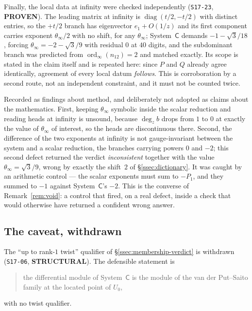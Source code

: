 Finally, the local data at infinity were checked independently
(\texttt{S17-23}, \textbf{PROVEN}). The leading matrix at infinity is
$\operatorname{diag}(t/2,-t/2)$ with distinct entries, so the $+t/2$ branch has
eigenvector $e_1+O(1/z)$ and its first component carries exponent
$\theta_\infty/2$ with no shift, for any $\theta_\infty$; System~$\mathsf C$
demands $-1-\sqrt3/18$, forcing $\theta_\infty=-2-\sqrt3/9$ with residual $0$
at $40$ digits, and the subdominant branch was predicted from
$\operatorname{ord}_\infty(n_{12})=2$ and matched exactly. Its scope is stated
in the claim itself and is repeated here: since $P$ and $Q$ already agree
identically, agreement of every local datum \emph{follows}. This is
corroboration by a second route, not an independent constraint, and it must not
be counted twice.

\begin{remark}\label{rem:s20b-defects}
Recorded as findings about method, and deliberately not adopted as claims about
the mathematics. First, keeping $\theta_\infty$ symbolic inside the scalar
reduction and reading heads at infinity is unsound, because $\deg_z b$ drops
from $1$ to $0$ at exactly the value of $\theta_\infty$ of interest, so the
heads are discontinuous there. Second, the difference of the two exponents at
infinity is not gauge-invariant between the system and a scalar reduction, the
branches carrying powers $0$ and $-2$; this second defect returned the verdict
\emph{inconsistent} together with the value $\theta_\infty=\sqrt3/9$, wrong by
exactly the shift~$2$ of \S\ref{ssec:dictionary}. It was caught by an
arithmetic control --- the scalar exponents must sum to $-P_1$, and they summed
to $-1$ against System~$\mathsf C$'s $-2$. This is the converse of
Remark~\ref{rem:void}: a control that fired, on a real defect, inside a check
that would otherwise have returned a confident wrong answer.
\end{remark}

\subsection{The caveat, withdrawn}\label{ssec:withdrawn}

The ``up to rank-$1$ twist'' qualifier of \S\ref{ssec:membership-verdict} is
withdrawn (\texttt{S17-06}, \textbf{STRUCTURAL}). The defensible statement is
\begin{quote}
  the differential module of System~$\mathsf C$ is the module of the van der
  Put--Saito family at the located point of $U_0$,
\end{quote}
with no twist qualifier.

